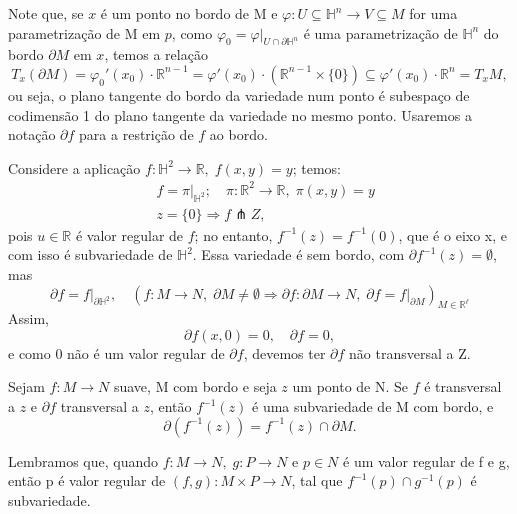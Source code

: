 \documentclass[../differential_topology.tex]{subfiles}
\begin{document}
Note que, se \(x\) é um ponto no bordo de M e \(\varphi :U\subseteq \mathbb{H}^{n}\rightarrow V\subseteq M\) for uma parametrização de M em \(p\), como \(\varphi_{0} = \varphi|_{U\cap \partial \mathbb{H}^{n}}\) é uma parametrização de \(\mathbb{H}^{n}\) do bordo \(\partial M\) em \(x\), temos a relação
\[
	T_{x}(\partial M) = \varphi_{0}'(x_{0})\cdot \mathbb{R}^{n-1} = \varphi'(x_{0})\cdot (\mathbb{R}^{n-1}\times \{0\})\subseteq \varphi '(x_{0})\cdot \mathbb{R}^{n} = T_{x}M,
\]
ou seja, o plano tangente do bordo da variedade num ponto é subespaço de codimensão 1 do plano tangente da variedade no mesmo ponto.
Usaremos a notação \(\partial f\) para a restrição de \(f\) ao bordo.
\begin{example}
	Considere a aplicação \(f:\mathbb{H}^{2}\rightarrow \mathbb{R},\; f(x, y) = y\); temos:
	\begin{align*}
		 & f = \pi |_{\mathbb{H}^{2}}; \quad \pi :\mathbb{R}^{2}\rightarrow \mathbb{R},\; \pi (x, y) = y \\
		 & z = \{0\} \Rightarrow f \pitchfork Z,
	\end{align*}
	pois \(u\in \mathbb{R}\) é valor regular de \(f\); no entanto, \(f^{-1}(z)=f^{-1}(0)\), que é o eixo x, e com isso é subvariedade de \(\mathbb{H}^{2}\).
	Essa variedade é sem bordo, com \(\partial f^{-1}(z) = \emptyset \), mas
	\[
		\partial f = f|_{\partial \mathbb{H}^{2}}, \quad (f:M\rightarrow N,\; \partial M \neq \emptyset \Rightarrow \partial f :\partial M\rightarrow N,\; \partial f = f|_{\partial M})_{M\in \mathbb{R}^{\ell }}
	\]
	Assim,
	\[
		\partial f(x, 0) = 0, \quad \partial f = 0,
	\]
	e como 0 não é um valor regular de \(\partial f\), devemos ter \(\partial f\) não transversal a Z.
\end{example}
\begin{theorem*}
	Sejam \(f:M\rightarrow N\) suave, M com bordo e seja \(z\) um ponto de N. Se \(f\) é transversal a \(z\) e \(\partial f\) transversal a \(z\), então \(f^{-1}(z)\) é uma subvariedade de M com bordo, e
	\[
		\partial (f^{-1}(z)) = f^{-1}(z)\cap \partial M.
	\]
\end{theorem*}

Lembramos que, quando \(f:M\rightarrow N,\; g:P\rightarrow N\) e \(p\in N\) é um valor regular de f e g, então p é valor regular de \((f, g):M\times P\rightarrow N\), tal que \(f^{-1}(p)\cap g^{-1}(p)\) é subvariedade.
\end{document}
